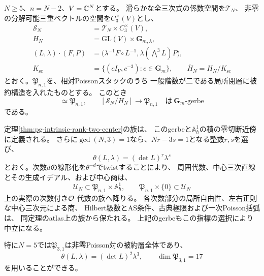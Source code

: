 \begin{corollary}[階数二の被約Poisson層全体への次数付き代数の降下]
\label{cor:pg-intrinsic-rank-two-descent}
$N\ge5$、$n=N-2$、$V=\mathbb C^N$とする。
滑らかな全三次式の係数空間を$\mathcal T_N$、
非零の分解可能三重ベクトルの空間を$C_3^\times(V)$とし、
\begin{equation}
 \begin{aligned}
 \mathcal S_N&=\mathcal T_N\times C_3^\times(V),\\
 H_N&=\mathrm{GL}(V)\times\mathbf G_{m,\lambda},\\
 (L,\lambda)\cdot(F,P)
   &=\bigl(\lambda^{-1}F\circ L^{-1},
            \lambda(\bigwedge^3L)P\bigr),\\
 K_{\mathrm{sc}}&=\{(cI_V,c^{-3}):c\in\mathbf G_m\},
 \qquad \overline H_N=H_N/K_{\mathrm{sc}}
 \end{aligned}
 \label{eq:pg-intrinsic-descent-base}
\end{equation}
とおく。$\mathfrak P_{n,1}$を、相対Poissonスタックのうち
一般階数が二である局所閉層に被約構造を入れたものとする。
このとき
\begin{equation}
 [\mathcal S_N/\overline H_N]\simeq\mathfrak P_{n,1},
 \qquad
 [\mathcal S_N/H_N]\longrightarrow\mathfrak P_{n,1}
 \quad\text{は}\ \mathbf G_m\text{-gerbe}
 \label{eq:pg-intrinsic-descent-gerbe}
\end{equation}
である。

定理\ref{thm:pg-intrinsic-rank-two-center}の族は、
このgerbeと$\mathbb A^1_\hbar$の積の零切断近傍に定義される。
さらに$\gcd(N,3)=1$なら、$Nr-3s=1$となる整数$r,s$を選び、
\begin{equation}
 \theta(L,\lambda)=(\det L)^r\lambda^s
 \label{eq:pg-intrinsic-descent-character}
\end{equation}
とおく。次数$d$の線形化を$\theta^{-d}$でtwistすることにより、
周囲代数、中心三次直線とその生成イデアル、および中心商は、
\begin{equation}
 \mathcal U_N\subset\mathfrak P_{n,1}\times\mathbb A^1_\hbar,
 \qquad
 \mathfrak P_{n,1}\times\{0\}\subset\mathcal U_N
 \label{eq:pg-intrinsic-descended-open}
\end{equation}
上の実際の次数付き$\mathcal O$-代数の族へ降りる。
各次数部分の局所自由性、左右正則な中心三次元による商、
Hilbert級数とAS条件、古典極限および一次Poisson括弧は、
同定理のatlas上の族から保たれる。
上記のgerbeもこの指標の選択により中立になる。

特に$N=5$では$\mathfrak P_{3,1}$は非零Poisson対の被約層全体であり、
\begin{equation}
 \theta(L,\lambda)=(\det L)^2\lambda^3,
 \qquad \dim\mathfrak P_{3,1}=17
 \label{eq:pg-intrinsic-threefold-descent}
\end{equation}
を用いることができる。
\end{corollary}
